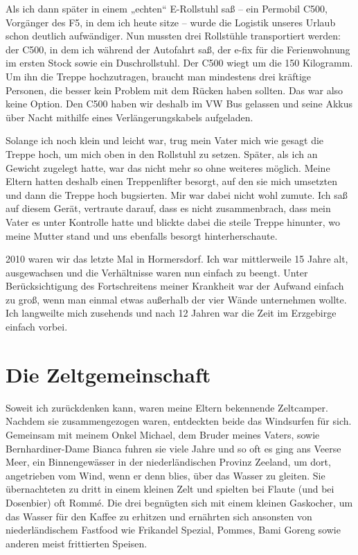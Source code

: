 \documentclass[fontsize=14pt,a4paper,headinclude,DIV=calc,automark]{scrbook}
\begin{document}
Als ich dann später in einem „echten“ E-Rollstuhl saß – ein Permobil C500, Vorgänger des F5, in dem ich heute sitze – wurde die Logistik unseres Urlaub schon deutlich aufwändiger. Nun mussten drei Rollstühle transportiert werden: der C500, in dem ich während der Autofahrt saß, der e-fix für die Ferienwohnung im ersten Stock sowie ein Duschrollstuhl. Der C500 wiegt um die 150 Kilogramm. Um ihn die Treppe hochzutragen, braucht man mindestens drei kräftige Personen, die besser kein Problem mit dem Rücken haben sollten. Das war also keine Option. Den C500 haben wir deshalb im VW Bus gelassen und seine Akkus über Nacht mithilfe eines Verlängerungskabels aufgeladen.

Solange ich noch klein und leicht war, trug mein Vater mich wie gesagt die Treppe hoch, um mich oben in den Rollstuhl zu setzen. Später, als ich an Gewicht zugelegt hatte, war das nicht mehr so ohne weiteres möglich. Meine Eltern hatten deshalb einen Treppenlifter besorgt, auf den sie mich umsetzten und dann die Treppe hoch bugsierten. Mir war dabei nicht wohl zumute. Ich saß auf diesem Gerät, vertraute darauf, dass es nicht zusammenbrach, dass mein Vater es unter Kontrolle hatte und blickte dabei die steile Treppe hinunter, wo meine Mutter stand und uns ebenfalls besorgt hinterherschaute.

2010 waren wir das letzte Mal in Hormersdorf. Ich war mittlerweile 15 Jahre alt, ausgewachsen und die Verhältnisse waren nun einfach zu beengt. Unter Berücksichtigung des Fortschreitens meiner Krankheit war der Aufwand einfach zu groß, wenn man einmal etwas außerhalb der vier Wände unternehmen wollte. Ich langweilte mich zusehends und nach 12 Jahren war die Zeit im Erzgebirge einfach vorbei.

\section{Die Zeltgemeinschaft}
\label{sec:zeltgemeinschaft}

Soweit ich zurückdenken kann, waren meine Eltern bekennende Zeltcamper. Nachdem sie zusammengezogen waren, entdeckten beide das Windsurfen für sich. Gemeinsam mit meinem Onkel Michael, dem Bruder meines Vaters, sowie Bernhardiner-Dame Bianca fuhren sie viele Jahre und so oft es ging ans Veerse Meer, ein Binnengewässer in der niederländischen Provinz Zeeland, um dort, angetrieben vom Wind, wenn er denn blies, über das Wasser zu gleiten. Sie übernachteten zu dritt in einem kleinen Zelt und spielten bei Flaute (und bei Dosenbier) oft Rommé. Die drei begnügten sich mit einem kleinen Gaskocher, um das Wasser für den Kaffee zu erhitzen und ernährten sich ansonsten von niederländischem Fastfood wie Frikandel Spezial, Pommes, Bami Goreng sowie anderen meist frittierten Speisen.
\end{document}
